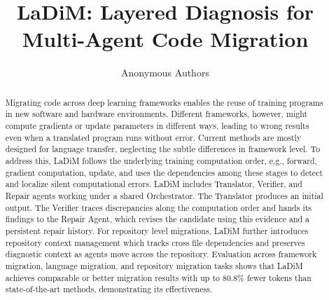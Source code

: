 \documentclass{article}
\begin{document}
\title{LaDiM: Layered Diagnosis for Multi-Agent Code Migration}
\author{Anonymous Authors}
\maketitle
\suppressfloats[t]
\begin{abstract}
Migrating code across deep learning frameworks enables the reuse of training programs in new software and hardware environments. Different frameworks, however, might compute gradients or update parameters in different ways, leading to wrong results even when a translated program runs without error. Current methods are mostly designed for language transfer, neglecting the subtle differences in framework level. To address this, LaDiM follows the underlying training computation order, e.g., forward, gradient computation, update, and uses the dependencies among these stages to detect and localize silent computational errors. LaDiM includes Translator, Verifier, and Repair agents working under a shared Orchestrator. The Translator produces an initial output. The Verifier traces discrepancies along the computation order and hands its findings to the Repair Agent, which revises the candidate using this evidence and a persistent repair history. For repository level migrations, LaDiM further introduces repository context management which tracks cross file dependencies and preserves diagnostic context as agents move across the repository. Evaluation across framework migration, language migration, and repository migration tasks shows that LaDiM achieves comparable or better migration results with up to 80.8\% fewer tokens than state-of-the-art methods, demonstrating its effectiveness.
\end{abstract}
\end{document}
